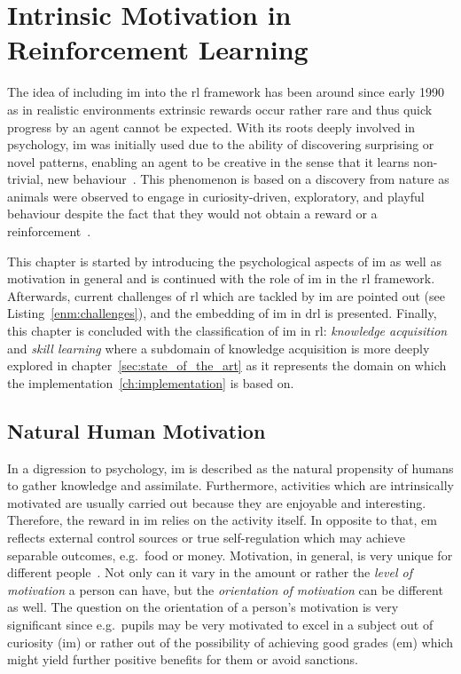 \documentclass[draft,final]{vutinfth} %
\begin{document}
    \chapter{Intrinsic Motivation in Reinforcement Learning}\label{ch:intrinsic-motivation-in-reinforcement-learning}
    The idea of including \gls{im} into the \gls{rl} framework has been around since early 1990 as in realistic environments extrinsic rewards occur rather rare and thus quick progress by an agent cannot be expected.
    With its roots deeply involved in psychology, \gls{im} was initially used due to the ability of discovering surprising or novel patterns, enabling an agent to be creative in the sense that it learns non-trivial, new behaviour~\citep{schmidhuber_formal_2010}.
    This phenomenon is based on a discovery from nature as animals were observed to engage in curiosity-driven, exploratory, and playful behaviour despite the fact that they would not obtain a reward or a reinforcement~\citep{white_motivation_1959}.

    This chapter is started by introducing the psychological aspects of \gls{im} as well as motivation in general and is continued with the role of \gls{im} in the \gls{rl} framework.
    Afterwards, current challenges of \gls{rl} which are tackled by \gls{im} are pointed out (see Listing~\ref{enm:challenges}), and the embedding of \gls{im} in \gls{drl} is presented.
    Finally, this chapter is concluded with the classification of \gls{im} in \gls{rl}: \textit{knowledge acquisition} and \textit{skill learning} where a subdomain of knowledge acquisition is more deeply explored in chapter~\ref{sec:state_of_the_art} as it represents the domain on which the implementation~\eqref{ch:implementation} is based on.


    \section{Natural Human Motivation}

    In a digression to psychology, \gls{im} is described as the natural propensity of humans to gather knowledge and assimilate.
    Furthermore, activities which are intrinsically motivated are usually carried out because they are enjoyable and interesting.
    Therefore, the reward in \gls{im} relies on the activity itself.
    In opposite to that, \gls{em} reflects external control sources or true self-regulation which may achieve separable outcomes, e.g.\ food or money.
    Motivation, in general, is very unique for different people~\citep{ryan_intrinsic_2000}.
    Not only can it vary in the amount or rather the \textit{level of motivation} a person can have, but the \textit{orientation of motivation} can be different as well.
    The question on the orientation of a person's motivation is very significant since e.g.\ pupils may be very motivated to excel in a subject out of curiosity (\gls{im}) or rather out of the possibility of achieving good grades (\gls{em}) which might yield further positive benefits for them or avoid sanctions.
\end{document}
